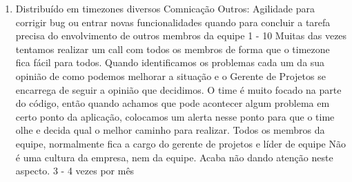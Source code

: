 \begin{enumerate}[leftmargin=0.5em]
	\item
	\begin{respostas3}
		{Distribuído em timezones diversos}
		{Comnicação \newline Outros: Agilidade para corrigir bug ou entrar novas funcionalidades quando para concluir a tarefa precisa do envolvimento de outros membros da equipe}
		{1 - 10}
		{Muitas das vezes tentamos realizar um call com todos os membros de forma que o timezone fica fácil para todos. Quando identificamos os problemas cada um da sua opinião de como podemos melhorar a situação e o Gerente de Projetos se encarrega de seguir a opinião que decidimos.}
		{O time é muito focado na parte do código, então quando achamos que pode acontecer algum problema em certo ponto da aplicação, colocamos um alerta nesse ponto para que o time olhe e decida qual o melhor caminho para realizar.}
		{Todos os membros da equipe, normalmente fica a cargo do gerente de projetos e líder de equipe}
		{Não é uma cultura da empresa, nem da equipe. Acaba não dando atenção neste aspecto.}
		{3 - 4 vezes por mês}
	\end{respostas3}
\end{enumerate}